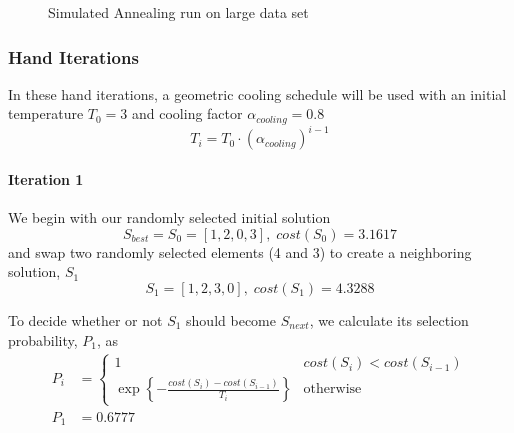 \documentclass[a4paper]{article}
\newcommand{\subsubsubsection}[1]{\paragraph{#1} \mbox{}}
\begin{document}
\begin{center}
\begin{figure}
\noindent{}
\caption{Simulated Annealing run on large data set}
\end{figure}
\end{center}

\subsubsection{Hand Iterations}

In these hand iterations, a geometric cooling schedule will be used with an initial temperature $T_0 = 3$ and cooling factor $\alpha_\mathit{cooling} = 0.8$
$$T_i = T_0 \cdot \left( \alpha_\mathit{cooling} \right)^{i - 1}$$

\subsubsubsection{Iteration 1}

We begin with our randomly selected initial solution
$$S_\mathit{best} = S_0 = [ 1, 2, 0, 3 ], \; \mathit{cost}(S_0) = 3.1617$$
and swap two randomly selected elements (4 and 3) to create a neighboring
solution, $S_1$
$$S_1 = [ 1, 2, 3, 0 ], \; \mathit{cost}(S_1) = 4.3288$$

To decide whether or not $S_1$ should become $S_\mathit{next}$, we calculate its
selection probability, $P_1$, as
\begin{align*}
P_i & =
\begin{cases}
  1 & \mathit{cost}(S_{i}) < \mathit{cost}(S_{i - 1}) \\
  \exp \left\{-\frac{\mathit{cost}(S_{i}) - \mathit{cost}(S_{i - 1})}{T_i}\right\} & \text{otherwise}
\end{cases} \\
P_1 & = 0.6777
\end{align*}
\end{document}
